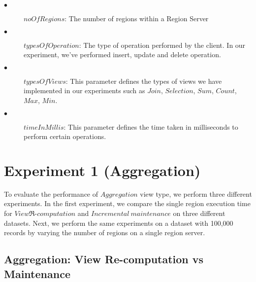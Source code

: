 \documentclass[11pt,a4paper,bibtotoc,idxtotoc,headsepline,footsepline,footexclude,BCOR12mm,DIV13]{scrbook}
\begin{document}
\begin{description}
	\item[$\bullet$]  $noOfRegions$: The number of regions within a Region Server 
\end{description}

\begin{description}
	\item[$\bullet$]  $typesOfOperation$: The type of operation performed by the client. In our experiment, we've performed insert, update and delete operation. 
\end{description}

\begin{description}
	\item[$\bullet$]  $typesOfViews$: This parameter defines the types of views we have implemented in our experiments such as $Join$, $Selection$, $Sum$, $Count$, $Max$, $Min$. 
\end{description}

\begin{description}
	\item[$\bullet$]  $timeInMillis$: This parameter defines the time taken in milliseconds to perform certain operations. 
\end{description}

\section{Experiment 1 (Aggregation)}
\label{(sec:AggrExp)}
To evaluate the performance of $Aggregation$ view type, we perform three different experiments. In the first experiment, we compare the single region execution time for $View\Re$-$computation$ and $Incremental \  maintenance$ on three different datasets. Next, we perform the same experiments on a dataset with 100,000 records by varying the number of regions on a single region server.
 
\subsection{Aggregation: View Re-computation vs Maintenance}
\end{document}
